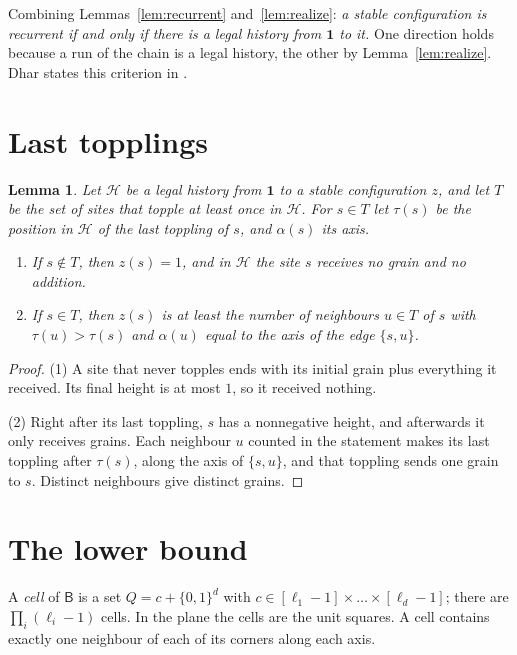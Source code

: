 \documentclass[11pt]{amsart}
\newtheorem{lemma}[theorem]{Lemma}
\theoremstyle{definition}
\newcommand{\one}{\mathbf 1}
\newcommand{\B}{\mathsf B}
\begin{document}
Combining Lemmas~\ref{lem:recurrent} and~\ref{lem:realize}: \emph{a stable configuration is recurrent if and only if there is a legal history from $\one$ to it.} One direction holds because a run of the chain is a legal history, the other by Lemma~\ref{lem:realize}. Dhar states this criterion in \cite[\S6]{Dha99b}.

\section{Last topplings}\label{sec:last}

\begin{lemma}\label{lem:last}
Let $\mathcal H$ be a legal history from $\one$ to a stable configuration $z$, and let $T$ be the set of sites that topple at least once in $\mathcal H$. For $s\in T$ let $\tau(s)$ be the position in $\mathcal H$ of the last toppling of $s$, and $\alpha(s)$ its axis.
\begin{enumerate}
\item If $s\notin T$, then $z(s)=1$, and in $\mathcal H$ the site $s$ receives no grain and no addition.
\item If $s\in T$, then $z(s)$ is at least the number of neighbours $u\in T$ of $s$ with $\tau(u)>\tau(s)$ and $\alpha(u)$ equal to the axis of the edge $\{s,u\}$.
\end{enumerate}
\end{lemma}

\begin{proof}
(1) A site that never topples ends with its initial grain plus everything it received. Its final height is at most $1$, so it received nothing.

(2) Right after its last toppling, $s$ has a nonnegative height, and afterwards it only receives grains. Each neighbour $u$ counted in the statement makes its last toppling after $\tau(s)$, along the axis of $\{s,u\}$, and that toppling sends one grain to $s$. Distinct neighbours give distinct grains.
\end{proof}

\section{The lower bound}\label{sec:lower}

A \emph{cell} of $\B$ is a set $Q=c+\{0,1\}^d$ with $c\in[\ell_1-1]\times\dots\times[\ell_d-1]$; there are $\prod_i(\ell_i-1)$ cells. In the plane the cells are the unit squares. A cell contains exactly one neighbour of each of its corners along each axis.
\end{document}
